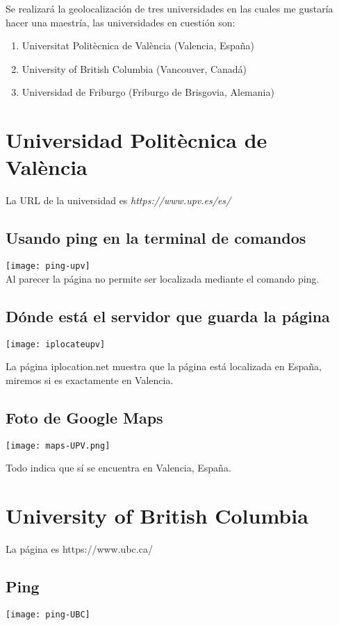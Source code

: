 Se realizará la geolocalización de tres universidades en las cuales me gustaría hacer una maestría, las universidades en cuestión son:
\begin{enumerate}
	\item Universitat Politècnica de València (Valencia, España)
	\item University of British Columbia (Vancouver, Canadá)
	\item Universidad de Friburgo (Friburgo de Brisgovia, Alemania)
\end{enumerate}

\section{Universidad Politècnica de València}
La URL de la universidad es \textit{https://www.upv.es/es/}
\subsection{Usando ping en la terminal de comandos}
\texttt{[image: ping-upv]}\\
Al parecer la página no permite ser localizada mediante el comando ping.
\subsection{Dónde está el servidor que guarda la página}

\texttt{[image: iplocateupv]}

La página iplocation.net muestra que la página está localizada en España, miremos si es exactamente en Valencia.

\subsection{Foto de Google Maps}

\texttt{[image: maps-UPV.png]}

Todo indica que sí se encuentra en Valencia, España.

\section{University of British Columbia}
La página es https://www.ubc.ca/
\subsection{Ping}
\texttt{[image: ping-UBC]}

